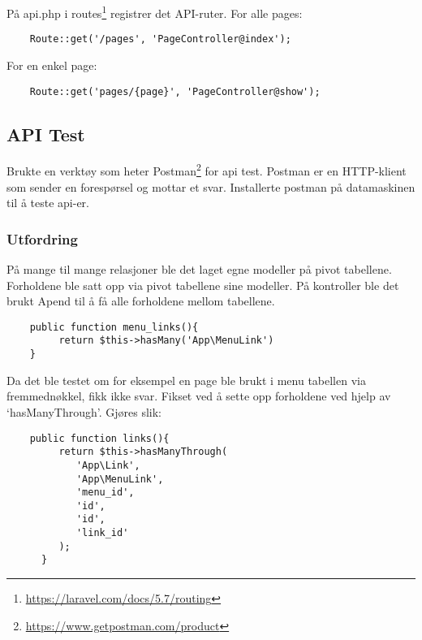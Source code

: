 På api.php i routes\footnote{\url{https://laravel.com/docs/5.7/routing}}  registrer det API-ruter.
For alle pages:
\begin{lstlisting}
    Route::get('/pages', 'PageController@index');
\end{lstlisting} 
For en enkel page:
\begin{lstlisting}
    Route::get('pages/{page}', 'PageController@show');
\end{lstlisting}

\subsection{API Test}
Brukte en verktøy som heter Postman\footnote{\url{https://www.getpostman.com/product}} for api test. Postman er en HTTP-klient som sender en forespørsel og mottar et svar. Installerte postman på datamaskinen til å teste api-er.
\subsubsection{Utfordring} 
På mange til mange relasjoner ble  det laget egne modeller på pivot tabellene.
Forholdene ble satt opp via pivot tabellene sine modeller. På kontroller ble det brukt  Apend til å få alle forholdene mellom tabellene. 
\begin{lstlisting}
    public function menu_links(){
         return $this->hasMany('App\MenuLink')
    }
\end{lstlisting}
Da det ble testet om for eksempel en page ble brukt i menu tabellen via fremmednøkkel, fikk ikke svar.
Fikset ved å sette opp forholdene ved hjelp av ‘hasManyThrough’. Gjøres slik:
\begin{lstlisting}
    public function links(){
         return $this->hasManyThrough(    
            'App\Link',
            'App\MenuLink',
            'menu_id',
            'id',
            'id',
            'link_id'
         );
      }
\end{lstlisting}
    



\clearpage